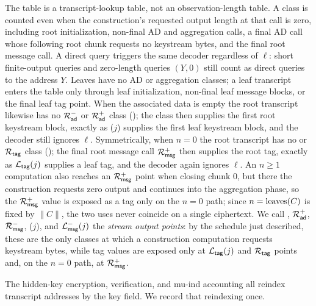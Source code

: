 The table is a transcript-lookup table, not an observation-length
table. A class is counted even when the construction's requested
output length at that call is zero, including root initialization,
non-final AD and aggregation calls, a final AD call whose following
root chunk requests no keystream bytes, and the final root message
call. A direct query triggers the same decoder regardless of $\ell$:
short finite-output queries and zero-length queries $(Y,0)$ still
count as direct queries to the address $Y$. Leaves have no AD or
aggregation classes; a leaf transcript enters the table only through
leaf initialization, non-final leaf message blocks, or the final leaf
tag point. When the associated data is empty the root transcript
likewise has no $\mathcal{R}_{\mathsf{ad}}^-$ or $\mathcal{R}_{\mathsf{ad}}^+$ class (); the
\Rinit class then supplies the first root keystream block, exactly as
\Linit($j$) supplies the first leaf keystream block, and the decoder
still ignores $\ell$. Symmetrically, when $n = 0$ the root transcript
has no \Ragg or $\mathcal{R}_{\mathsf{tag}}$ class (); the final root message
call $\mathcal{R}_{\mathsf{msg}}^+$ then supplies the root tag, exactly as $\mathcal{L}_{\mathsf{tag}}(j)$
supplies a leaf tag, and the decoder again ignores $\ell$. An $n \geq 1$
computation also reaches an $\mathcal{R}_{\mathsf{msg}}^+$ point when closing chunk $0$, but
there the construction requests zero output and continues into the
aggregation phase, so the $\mathcal{R}_{\mathsf{msg}}^+$ value is exposed as a tag only on
the $n = 0$ path; since $n = \operatorname{leaves}(C)$ is fixed by $\|C\|$, the two
uses never coincide on a single ciphertext. We call \Rinit, $\mathcal{R}_{\mathsf{ad}}^+$,
$\mathcal{R}_{\mathsf{msg}}^-$, \Linit($j$), and $\mathcal{L}_{\mathsf{msg}}^-(j)$ the \emph{stream output
points}: by the schedule just described, these are the only classes at
which a construction computation requests keystream bytes, while tag
values are exposed only at $\mathcal{L}_{\mathsf{tag}}(j)$ and $\mathcal{R}_{\mathsf{tag}}$ points and, on the
$n = 0$ path, at $\mathcal{R}_{\mathsf{msg}}^+$.

The hidden-key encryption, verification, and mu-ind accounting all
reindex transcript addresses by the key field. We record that reindexing
once.

